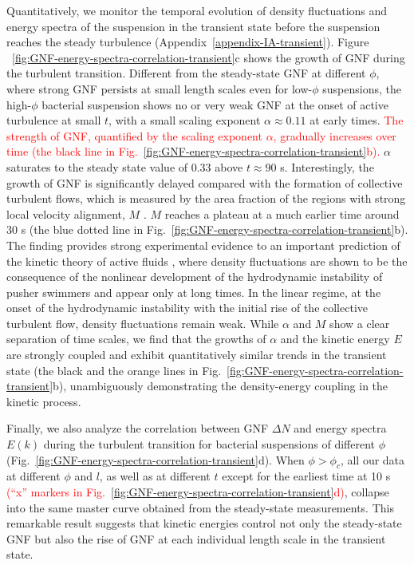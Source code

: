 \documentclass[twocolumn,aps,prx,amsmath,amssymb,longbibliography,superscriptaddress]{revtex4-2}
\begin{document}
Quantitatively, we monitor the temporal evolution of density fluctuations and energy spectra of the suspension in the transient state before the suspension reaches the steady turbulence (Appendix~\ref{appendix-IA-transient}). Figure ~\ref{fig:GNF-energy-spectra-correlation-transient}c shows the growth of GNF during the turbulent transition. Different from the steady-state GNF at different $\phi$, where strong GNF persists at small length scales even for low-$\phi$ suspensions, the high-$\phi$ bacterial suspension shows no or very weak GNF at the onset of active turbulence at small $t$, with a small scaling exponent $\alpha \approx 0.11$ at early times.
\textcolor{red}{The strength of GNF, quantified by the scaling exponent $\alpha$, gradually increases over time (the black line in Fig.~\ref{fig:GNF-energy-spectra-correlation-transient}b).}
$\alpha$ saturates to the steady state value of 0.33 above $t \approx 90$ s. Interestingly, the growth of GNF is significantly delayed compared with the formation of collective turbulent flows, which is measured by the area fraction of the regions with strong local velocity alignment, $M$ \cite{Cisneros2011, Peng2020}. $M$ reaches a plateau at a much earlier time around 30 s (the blue dotted line in Fig.~\ref{fig:GNF-energy-spectra-correlation-transient}b). The finding provides strong experimental evidence to an important prediction of the kinetic theory of active fluids \cite{Saintillan2008a, Saintillan2008b}, where density fluctuations are shown to be the consequence of the nonlinear development of the hydrodynamic instability of pusher swimmers and appear only at long times. In the linear regime, at the onset of the hydrodynamic instability with the initial rise of the collective turbulent flow, density fluctuations remain weak. While $\alpha$ and $M$ show a clear separation of time scales, we find that the growths of $\alpha$ and the kinetic energy $E$ are strongly coupled and exhibit quantitatively similar trends in the transient state (the black and the orange lines in Fig.~\ref{fig:GNF-energy-spectra-correlation-transient}b), unambiguously demonstrating the density-energy coupling in the kinetic process.

Finally, we also analyze the correlation between GNF $\Delta N$ and energy spectra $E(k)$ during the turbulent transition for bacterial suspensions of different $\phi$ (Fig.~\ref{fig:GNF-energy-spectra-correlation-transient}d). When $\phi>\phi_c$, all our data at different $\phi$ and $l$, as well as at different $t$ except for the earliest time at 10 s \textcolor{red}{(``x'' markers in Fig.~\ref{fig:GNF-energy-spectra-correlation-transient}d)}, collapse into the same master curve obtained from the steady-state measurements.
This remarkable result suggests that kinetic energies control not only the steady-state GNF but also the rise of GNF at each individual length scale in the transient state.
\end{document}
